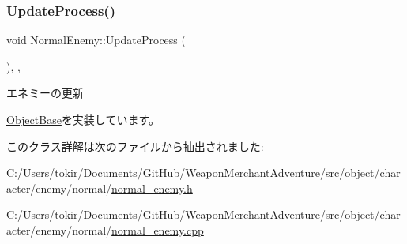 \subsubsection{\texorpdfstring{Update\+Process()}{UpdateProcess()}}
{\footnotesize\ttfamily void Normal\+Enemy\+::\+Update\+Process (\begin{DoxyParamCaption}{ }\end{DoxyParamCaption})\hspace{0.3cm}{\ttfamily [final]}, {\ttfamily [protected]}, {\ttfamily [virtual]}}



エネミーの更新 



\mbox{\hyperlink{class_object_base_a8b5b72b363a419767efde0b0e692ea95}{Object\+Base}}を実装しています。



このクラス詳解は次のファイルから抽出されました\+:\begin{DoxyCompactItemize}
\item 
C\+:/\+Users/tokir/\+Documents/\+Git\+Hub/\+Weapon\+Merchant\+Adventure/src/object/character/enemy/normal/\mbox{\hyperlink{normal__enemy_8h}{normal\+\_\+enemy.\+h}}\item 
C\+:/\+Users/tokir/\+Documents/\+Git\+Hub/\+Weapon\+Merchant\+Adventure/src/object/character/enemy/normal/\mbox{\hyperlink{normal__enemy_8cpp}{normal\+\_\+enemy.\+cpp}}\end{DoxyCompactItemize}
